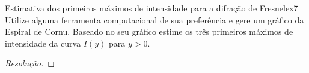 \begin{exercício}{Estimativa dos primeiros máximos de intensidade para a difração de Fresnel}{ex7}
    Utilize alguma ferramenta computacional de sua preferência e gere um gráfico da Espiral de Cornu. Baseado no seu gráfico estime os três primeiros máximos de intensidade da curva \(I(y)\) para \(y > 0.\)
\end{exercício}
\begin{proof}[Resolução]
    
\end{proof}
